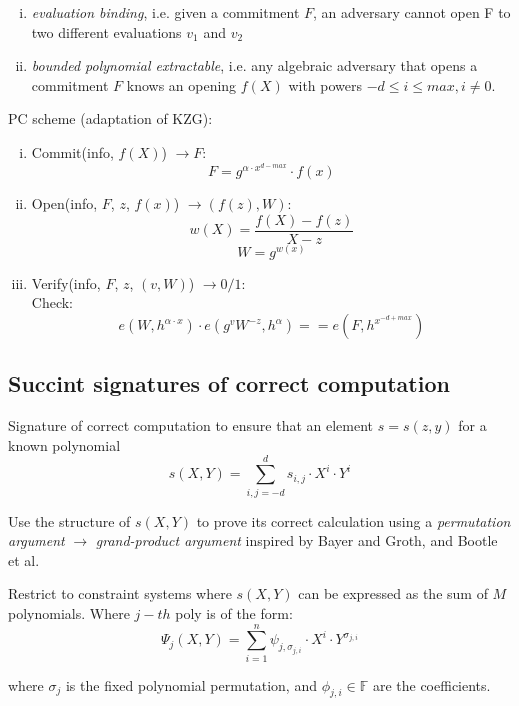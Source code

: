 \documentclass{article}
\theoremstyle{definition}
\begin{document}
\begin{enumerate}[i.]
    \item \emph{evaluation binding}, i.e. given a commitment $F$, an adversary cannot open F to two different evaluations $v_1$ and $v_2$
    \item \emph{bounded polynomial extractable}, i.e. any algebraic adversary that opens a commitment $F$ knows an opening $f(X)$ with powers $-d \leq i \leq max, i \neq 0$.
\end{enumerate}

\vspace{0.5cm}
PC scheme (adaptation of KZG):

\begin{enumerate}[i.]
    \item Commit(info, $f(X)$) $\longrightarrow F$:
	$$F = g^{\alpha \cdot x^{d-max}} \cdot f(x)$$
    \item Open(info, $F$, $z$, $f(x)$) $\longrightarrow (f(z), W)$:
	$$w(X) = \frac{f(X) - f(z)}{X-z}$$
	$$W = g^{w(x)}$$
    \item Verify(info, $F$, $z$, $(v, W)$) $\longrightarrow 0/1$:\\
	Check:
	$$e(W, h^{\alpha \cdot x}) \cdot
	e(g^v W^{-z}, h^{\alpha})
	== e(F, h^{x^{-d+max}})$$
\end{enumerate}

\subsection{Succint signatures of correct computation}
Signature of correct computation to ensure that an element $s=s(z, y)$ for a known polynomial
$$s(X, Y) = \sum_{i, j = -d}^d s_{i, j} \cdot X^i \cdot Y^i$$

Use the structure of $s(X, Y)$ to prove its correct calculation using a \emph{permutation argument} $\longrightarrow$ \emph{grand-product argument} inspired by Bayer and Groth, and Bootle et al.

Restrict to constraint systems where $s(X, Y)$ can be expressed as the sum of $M$ polynomials. Where $j-th$ poly is of the form:
$$
\Psi_j(X, Y) =
    \sum_{i=1}^n \psi_{j, \sigma_{j, i}}
    \cdot X^i \cdot Y^{\sigma_{j, i}}
$$

where $\sigma_j$ is the fixed polynomial permutation, and $\phi_{j, i} \in \mathbb{F}$ are the coefficients.

\vspace{1cm}
\vspace{1cm}




\end{document}
